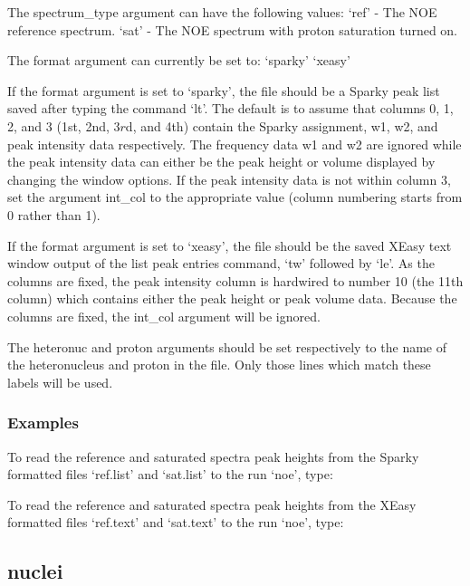 The spectrum\_type argument can have the following values:
    `ref' - The NOE reference spectrum.
    `sat' - The NOE spectrum with proton saturation turned on.


The format argument can currently be set to:
    `sparky'
    `xeasy'

If the format argument is set to `sparky', the file should be a Sparky peak list saved after
typing the command `lt'.  The default is to assume that columns 0, 1, 2, and 3 (1st, 2nd,
3$r$d, and 4th) contain the Sparky assignment, w1, w2, and peak intensity data respectively.
The frequency data w1 and w2 are ignored while the peak intensity data can either be the
peak height or volume displayed by changing the window options.  If the peak intensity data
is not within column 3, set the argument int\_col to the appropriate value (column numbering
starts from 0 rather than 1).

If the format argument is set to `xeasy', the file should be the saved XEasy text window
output of the list peak entries command, `tw' followed by `le'.  As the columns are fixed,
the peak intensity column is hardwired to number 10 (the 11th column) which contains either
the peak height or peak volume data.  Because the columns are fixed, the int\_col argument
will be ignored.


The heteronuc and proton arguments should be set respectively to the name of the
heteronucleus and proton in the file.  Only those lines which match these labels will be
used.


\subsubsection{Examples}

To read the reference and saturated spectra peak heights from the Sparky formatted files
`ref.list' and `sat.list' to the run `noe', type:


To read the reference and saturated spectra peak heights from the XEasy formatted files
`ref.text' and `sat.text' to the run `noe', type:




\newpage

\subsection{nuclei}


